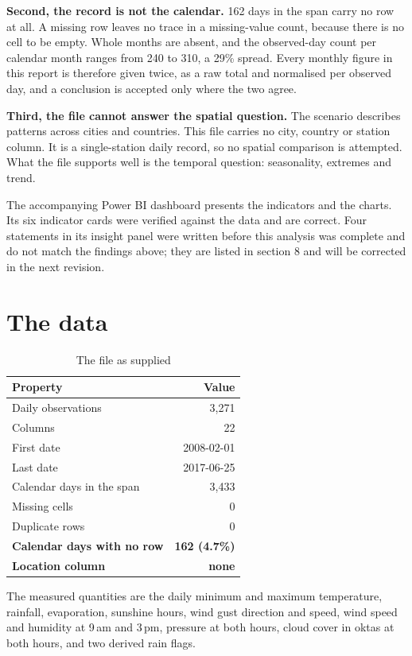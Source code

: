 \documentclass[12pt,a4paper]{article}
\begin{document}
\textbf{Second, the record is not the calendar.} 162 days in the span carry no row at
all. A missing row leaves no trace in a missing-value count, because there is no cell
to be empty. Whole months are absent, and the observed-day count per calendar month
ranges from 240 to 310, a 29\% spread. Every monthly figure in this report is
therefore given twice, as a raw total and normalised per observed day, and a
conclusion is accepted only where the two agree.

\textbf{Third, the file cannot answer the spatial question.} The scenario describes
patterns across cities and countries. This file carries no city, country or station
column. It is a single-station daily record, so no spatial comparison is attempted.
What the file supports well is the temporal question: seasonality, extremes and trend.

The accompanying Power BI dashboard presents the indicators and the charts. Its six
indicator cards were verified against the data and are correct. Four statements in its
insight panel were written before this analysis was complete and do not match the
findings above; they are listed in section 8 and will be corrected in the next
revision.

\section{The data}

\begin{table}[htbp]\centering
\caption{The file as supplied}
\small
\begin{tabular}{@{}lr@{}}
\toprule
\textbf{Property} & \textbf{Value} \\
\midrule
Daily observations & 3{,}271 \\
Columns & 22 \\
First date & 2008-02-01 \\
Last date & 2017-06-25 \\
Calendar days in the span & 3{,}433 \\
\midrule
Missing cells & 0 \\
Duplicate rows & 0 \\
\textbf{Calendar days with no row} & \textbf{162 \enspace(4.7\%)} \\
\textbf{Location column} & \textbf{none} \\
\bottomrule
\end{tabular}
\end{table}

The measured quantities are the daily minimum and maximum temperature, rainfall,
evaporation, sunshine hours, wind gust direction and speed, wind speed and humidity
at 9\,am and 3\,pm, pressure at both hours, cloud cover in oktas at both hours, and
two derived rain flags.
\end{document}
